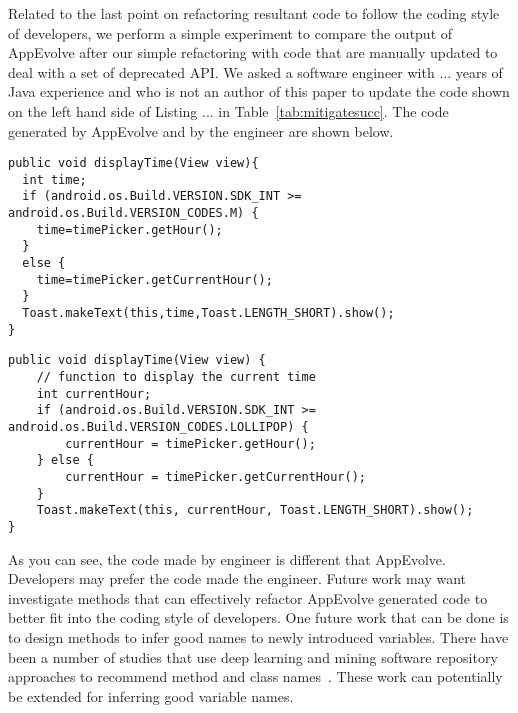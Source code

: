Related to the last point on refactoring resultant code to follow the coding style of developers, we perform a simple experiment to compare the output of AppEvolve after our simple refactoring with code that are manually updated to deal with a set of deprecated API.  We
asked a software engineer with ... years of Java experience and who is not an author of this paper to update the code shown on the left hand side of Listing ... in Table~\ref{tab:mitigatesucc}. The code generated by AppEvolve and by the engineer are shown below.





\vspace{0.2cm}
\begin{lstlisting}[language=text,numbers=none]
public void displayTime(View view){
  int time;
  if (android.os.Build.VERSION.SDK_INT >= android.os.Build.VERSION_CODES.M) {
    time=timePicker.getHour();
  }
  else {
    time=timePicker.getCurrentHour();
  }
  Toast.makeText(this,time,Toast.LENGTH_SHORT).show();
}
\end{lstlisting}


\vspace{0.2cm}
\begin{lstlisting}[language=text,numbers=none]
public void displayTime(View view) {
    // function to display the current time
    int currentHour;
    if (android.os.Build.VERSION.SDK_INT >= android.os.Build.VERSION_CODES.LOLLIPOP) {
        currentHour = timePicker.getHour();
    } else {
        currentHour = timePicker.getCurrentHour();
    }
    Toast.makeText(this, currentHour, Toast.LENGTH_SHORT).show();
}
\end{lstlisting}

As you can see, the code made by engineer is different that AppEvolve. Developers may prefer the code made the engineer. Future work may want investigate methods that can effectively refactor AppEvolve generated code to better fit into the coding style of developers. One future work that can be done is to design methods to infer good names to newly introduced variables. There have been a number of studies that use deep learning and mining software repository approaches to recommend method and class names~\cite{...}. These work can potentially be extended for inferring good variable names.

